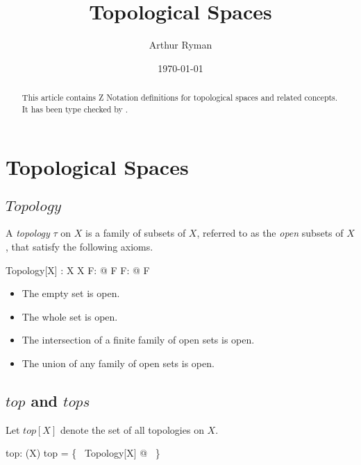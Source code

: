 \documentclass{amsart}
\begin{document}
\title{Topological Spaces}
\author{Arthur Ryman}
\date{\today}

\begin{abstract}
This article contains Z Notation definitions for topological spaces and related concepts.
It has been type checked by \fuzz.
\end{abstract}

\maketitle

\tableofcontents

\section{Topological Spaces}

\subsection{$Topology$}

A {\it topology} $\tau$ on $X$ is a family of subsets of $X$, referred to as the {\it open} subsets of $X$, that satisfy the following axioms.

\begin{schema}{Topology}[X]
	\tau: \Fam X
\where
	\emptyset \in \tau
\also
	X \in \tau
\also
	\forall F: \finset \tau @ \bigcap F \in \tau
\also
	\forall F: \power \tau @ \bigcup F \in \tau
\end{schema}

\begin{itemize}
\item The empty set is open.
\item The whole set is open.
\item The intersection of a finite family of open sets is open.
\item The union of any family of open sets is open. 
\end{itemize}

\subsection{$top$ and $tops$}

Let $top[X]$ denote the set of all topologies on $X$.

\begin{gendef}[X]
	top: \power(\Fam X)
\where
	top = \{~ Topology[X] @ \tau ~\}
\end{gendef}
\end{document}
